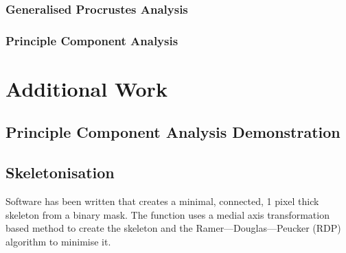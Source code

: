 \documentclass[a4paper, 12pt]{article}
\begin{document}
		\subsubsection{Generalised Procrustes Analysis}
		
		\subsubsection{Principle Component Analysis}

%
%

\section{Additional Work}

	\subsection{Principle Component Analysis Demonstration}

	\subsection{Skeletonisation}
	Software has been written that creates a minimal, connected, 1 pixel thick skeleton from a binary mask. The function uses a medial axis transformation based method \cite{skeletonisation}  to create the skeleton and the Ramer--–Douglas–--Peucker\cite{Ramer}\cite{Douglas_Peucker} (RDP) algorithm to minimise it.
%
\end{document}
